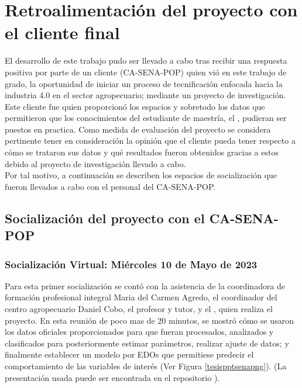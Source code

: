 \section{Retroalimentación del proyecto con el cliente final}

El desarrollo de este trabajo pudo ser llevado a cabo tras recibir una respuesta positiva por parte de un cliente (CA-SENA-POP) quien vió en este trabajo de grado, la oportunidad de iniciar un proceso de tecnificación enfocada hacia la industria 4.0 en el sector agropecuario; mediante un proyecto de investigación. Este cliente fue quien proporcionó los espacios y sobretodo los datos que permitieron que los conocimientos del estudiante de maestría, el \authorA, pudieran ser puestos en practica. Como  medida de evaluación del proyecto se considera pertinente tener en consideración la opinión que el cliente pueda tener respecto a cómo se trataron sus datos y qué resultados fueron obtenidos gracias a estos debido al proyecto de investigación llevado a cabo.\\

Por tal motivo, a continuación se describen los espacios de socialización que fueron llevados a cabo con el personal del CA-SENA-POP.



\subsection{Socialización del proyecto con el CA-SENA-POP}
\subsubsection{Socialización Virtual: Miércoles 10 de Mayo de 2023}
Para esta primer socialización se contó con la asistencia de la coordinadora de formación profesional integral Maria del Carmen Agredo, el coordinador del centro agropecuario Daniel Cobo, el profesor y tutor, \director \hspace{0.1cm} y el \authorA, \hspace{0.1cm}quien realiza el proyecto. En esta reunión de poco mas de 20 minutos, se mostró cómo se usaron los datos oficiales proporcionados para que fueran procesados, analizados y clasificados para posteriormente estimar parámetros, realizar ajuste de datos; y finalmente establecer un modelo por EDOs que permitiese predecir el comportamiento de las variables de interés (Ver Figura \ref{tesispptsenapng}). (La presentación usada puede ser encontrada en el repositorio \cite{msclfggrepo}).

